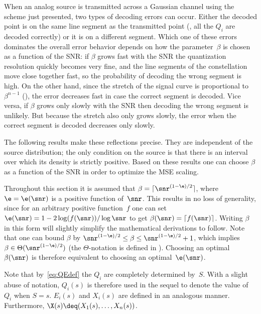 When an analog source is transmitted across a Gaussian channel using the scheme
just presented, two types of decoding errors can occur. Either the decoded point
is on the same line segment as the transmitted point (\ie, all the $Q_i$ are
decoded correctly) or it is on a different segment. Which one of these errors
dominates the overall error behavior depends on how the parameter~$\beta$ is
chosen as a function of the SNR: if $\beta$ grows fast with the SNR the
quantization resolution quickly becomes very fine, and the line segments of the
constellation move close together fast, so the probability of decoding the wrong
segment is high. On the other hand, since the stretch of the signal curve is
proportional to~$\beta^{n-1}$ (), the error decreases fast in
case the correct segment is decoded. Vice versa, if $\beta$ grows only slowly
with the SNR then decoding the wrong segment is unlikely. But because the
stretch also only grows slowly, the error when the correct segment is decoded
decreases only slowly.

The following results make these reflections precise. They are independent of
the source distribution; the only condition on the source is that there is an
interval over which its density is strictly positive. Based on these results one
can choose $\beta$ as a function of the SNR in order to optimize the MSE
scaling. 

\begin{remark}
  \label{rem:betaepswlog}
  Throughout this section it is assumed that $\beta = \lceil
  \snr^{(1-\e)/2}\rceil$, where $\e = \e(\snr)$ is a positive function
  of~$\snr$. This results in no loss of generality, since for an arbitrary
  positive function~$f$ one can set $\e(\snr) = 1-2 \log(f(\snr))/\log\snr$ to
  get $\beta(\snr) = \lceil f(\snr) \rceil$.  Writing $\beta$ in this form will
  slightly simplify the mathematical derivations to follow. Note that one can
  bound $\beta$ by $\snr^{(1-\e)/2} \le \beta \le \snr^{(1-\e)/2} + 1$, which
  implies $\beta \in \Theta(\snr^{(1-\e)/2})$ (the $\Theta$-notation is defined
  in ). Choosing an optimal $\beta(\snr)$ is therefore
  equivalent to choosing an optimal~$\e(\snr)$.
\end{remark}

\begin{remark}
  \label{rem:functionnotation}
  Note that by~\eqref{eq:QEdef} the $Q_i$ are completely determined by~$S$.
  With a slight abuse of notation, $Q_i(s)$ is therefore used in the sequel to
  denote the value of~$Q_i$ when $S = s$. $E_i(s)$ and $X_i(s)$ are defined in
  an analogous manner. Furthermore, $\X(s) \deq (X_1(s), \dots, X_n(s))$.
\end{remark}


